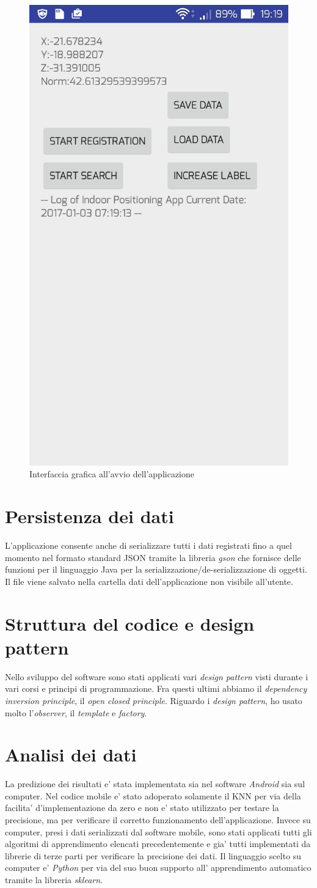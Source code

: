 \begin{figure}[H]
\centering
\includegraphics[width=0.3\linewidth]{img/app_screen}
\caption{Interfaccia grafica all'avvio dell'applicazione}
\label{fig:app_screen}
\end{figure}

\section*{Persistenza dei dati}
L'applicazione consente anche di serializzare tutti i dati registrati fino a quel momento nel formato standard JSON tramite la libreria \textit{gson} che fornisce delle funzioni  per il linguaggio Java per la serializzazione/de-serializzazione di oggetti. Il file viene salvato nella cartella dati dell'applicazione non visibile all'utente.

\section*{Struttura del codice e design pattern}
Nello sviluppo del software sono stati applicati vari \textit{design pattern} visti durante i vari corsi e principi di programmazione. Fra questi ultimi abbiamo il \textit{dependency inversion principle}, il \textit{open closed principle}. Riguardo i \textit{design pattern}, ho usato molto l'\textit{observer}, il \textit{template} e \textit{factory}.

\section*{Analisi dei dati}
La predizione dei risultati e' stata implementata sia nel software \textit{Android} sia sul computer. Nel codice mobile e' stato adoperato solamente il KNN per via della facilita' d'implementazione da zero e non e' stato  utilizzato per testare la precisione, ma per verificare il corretto funzionamento dell'applicazione. Invece su computer, presi i dati serializzati dal software mobile, sono stati applicati tutti gli algoritmi di apprendimento elencati precedentemente e gia' tutti implementati da librerie di terze parti per verificare la precisione dei dati. Il linguaggio scelto su computer e' \textit{Python} per via del suo buon supporto all' apprendimento automatico tramite la libreria \textit{sklearn}.